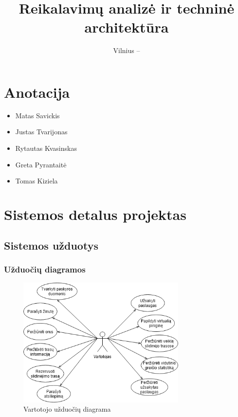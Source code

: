 \documentclass[oneside]{VUMIFPSkursinis}
\title{Reikalavimų analizė ir techninė architektūra}
\date{Vilnius – \the\year}
\begin{document}
\maketitle
\tableofcontents

\section{Anotacija}
\begin{itemize}
	\item{Matas Savickis}
	\item{Justas Tvarijonas}
	\item{Rytautas Kvasinskas}
	\item{Greta Pyrantaitė}
	\item{Tomas Kiziela}
\end{itemize}

\section{Sistemos detalus projektas}
	\subsection{Sistemos užduotys}
		\subsubsection{Užduočių diagramos}


			\begin{figure}[h]
    				\centering
    				\includegraphics[width=0.75\textwidth]{useCaseVartotojas.png}
    				\caption{Vartotojo užduočių diagrama}
    				\label{fig:VartotojoUseCasel}
			\end{figure}
\end{document}
